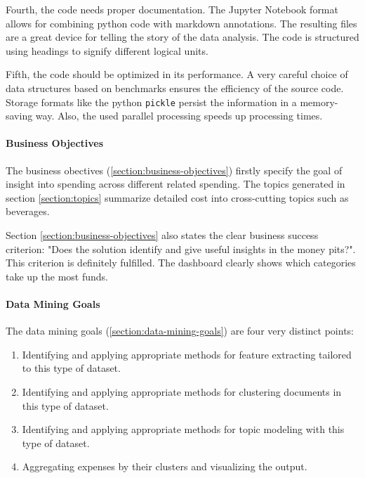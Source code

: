 Fourth, the code needs proper documentation. The Jupyter Notebook format allows for combining python code with markdown annotations. The resulting files are a great device for telling the story of the data analysis. The code is structured using headings to signify different logical units.

Fifth, the code should be optimized in its performance. A very careful choice of data structures based on benchmarks ensures the efficiency of the source code. Storage formats like the python \lstinline|pickle| persist the information in a memory-saving way. Also, the used parallel processing speeds up processing times.

\paragraph{Business Objectives}
The business obectives (\ref{section:business-objectives}) firstly specify the goal of insight into spending across different related spending. The topics generated in section \ref{section:topics} summarize detailed cost into cross-cutting topics such as beverages. 



Section \ref{section:business-objectives} also states the clear business success criterion: "Does the solution identify and give useful insights in the money pits?". This criterion is definitely fulfilled. The dashboard clearly shows which categories take up the most funds.


\paragraph{Data Mining Goals}
The data mining goals (\ref{section:data-mining-goals}) are four very distinct points:
\begin{enumerate}
	\item Identifying and applying appropriate methods for feature extracting tailored to this type of dataset.
	\item Identifying and applying appropriate methods for clustering documents in this type of dataset.
	\item Identifying and applying appropriate methods for topic modeling with this type of dataset.
	\item Aggregating expenses by their clusters and visualizing the output.
\end{enumerate}


